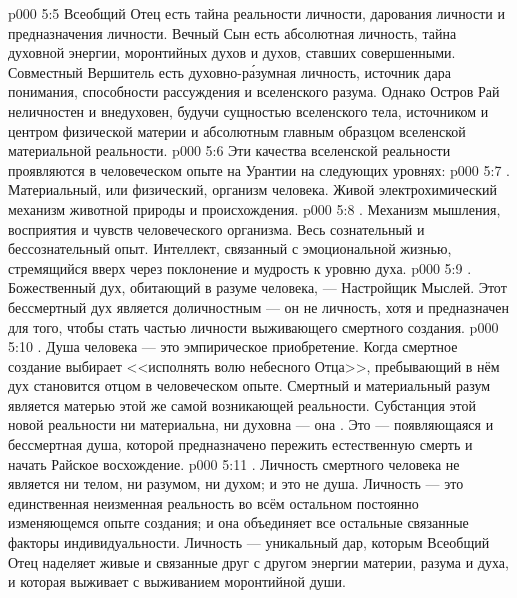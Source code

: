 \vs p000 5:5 \pc Всеобщий Отец есть тайна реальности личности, дарования личности и предназначения личности. Вечный Сын есть абсолютная личность, тайна духовной энергии, моронтийных духов и духов, ставших совершенными. Совместный Вершитель есть духовно\hyp{}р\'азумная личность, источник дара понимания, способности рассуждения и вселенского разума. Однако Остров Рай неличностен и внедуховен, будучи сущностью вселенского тела, источником и центром физической материи и абсолютным главным образцом вселенской материальной реальности.
\vs p000 5:6 \pc Эти качества вселенской реальности проявляются в человеческом опыте на Урантии на следующих уровнях:
\vs p000 5:7 . Материальный, или физический, организм человека. Живой электрохимический механизм животной природы и происхождения.
\vs p000 5:8 . Механизм мышления, восприятия и чувств человеческого организма. Весь сознательный и бессознательный опыт. Интеллект, связанный с эмоциональной жизнью, стремящийся вверх через поклонение и мудрость к уровню духа.
\vs p000 5:9 . Божественный дух, обитающий в разуме человека, --- Настройщик Мыслей. Этот бессмертный дух является доличностным --- он не личность, хотя и предназначен для того, чтобы стать частью личности выживающего смертного создания.
\vs p000 5:10 . Душа человека --- это эмпирическое приобретение. Когда смертное создание выбирает <<исполнять волю небесного Отца>>, пребывающий в нём дух становится отцом  в человеческом опыте. Смертный и материальный разум является матерью этой же самой возникающей реальности. Субстанция этой новой реальности ни материальна, ни духовна --- она . Это --- появляющаяся и бессмертная душа, которой предназначено пережить естественную смерть и начать Райское восхождение.
\vs p000 5:11 \pc {}. Личность смертного человека не является ни телом, ни разумом, ни духом; и это не душа. Личность --- это единственная неизменная реальность во всём остальном постоянно изменяющемся опыте создания; и она объединяет все остальные связанные факторы индивидуальности. Личность --- уникальный дар, которым Всеобщий Отец наделяет живые и связанные друг с другом энергии материи, разума и духа, и которая выживает с выживанием моронтийной души.
